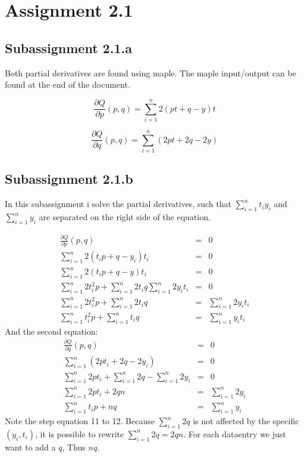 \documentclass[english]{article}
\begin{document}
\section*{Assignment 2.1}
\subsection*{Subassignment 2.1.a}

Both partial derivatives are found using maple. The maple input/output can be found at the end of the document.

\begin{equation}
\frac{\partial Q}{\partial p}(p,q)=\sum\limits_{i=1}^n 2(pt+q-y)t
\end{equation}

\begin{equation}
\frac{\partial Q}{\partial q}(p,q)=\sum\limits_{i=1}^n (2pt+2q-2y)
\end{equation}
\subsection*{Subassignment 2.1.b}
In this subassignment i solve the partial derivatives, such that $\sum\limits_{i=1}^n t_i y_i$ and $\sum\limits_{i=1}^n y_i$ are separated on the right side of the equation.  

\begin{eqnarray}
	\frac{\partial Q}{\partial p}(p,q) & = & 0\\
	\sum\limits_{i=1}^n 2(t_i p +q-y_i)t_i & = & 0 \\
	\sum\limits_{i=1}^n 2(t_i p  +q-y)t_i & = & 0 \\
	\sum\limits_{i=1}^n 2t_i^2 p +\sum\limits_{i=1}^n 2t_i q \sum\limits_{i=1}^n 2y_i t_i & = & 0 \\
	\sum\limits_{i=1}^n 2t_i ^2 p +\sum\limits_{i=1}^n 2t_i q & = & \sum\limits_{i=1}^n 2y_i t_i\\
	\sum\limits_{i=1}^n t_i^2 p +\sum\limits_{i=1}^n t_i q & = & \sum\limits_{i=1}^n y_i t_i 
\end{eqnarray}
And the second equation:
\begin{eqnarray}
	\frac{\partial Q}{\partial q}(p,q) & = & 0 \\
	\sum\limits_{i=1}^n (2pt_i+2q-2y_i) & = & 0 \\
	\sum\limits_{i=1}^n 2pt_i+ \sum\limits_{i=1}^n 2q- \sum\limits_{i=1}^n 2y_i & = & 0 \\
	\sum\limits_{i=1}^n 2pt_i+ 2qn & = & \sum\limits_{i=1}^n 2y_i \\
	\sum\limits_{i=1}^n t_i p + nq & = & \sum\limits_{i=1}^n y_i
\end{eqnarray}
Note the step equation 11 to 12. Because $\sum\limits_{i=1}^n 2q$ is not affected by the specific $(y_i,t_i)$, it is possible to rewrite  $\sum\limits_{i=1}^n 2q =2qn$. For each dataentry we just want to add a $q$, Thus $nq$.
\end{document}
